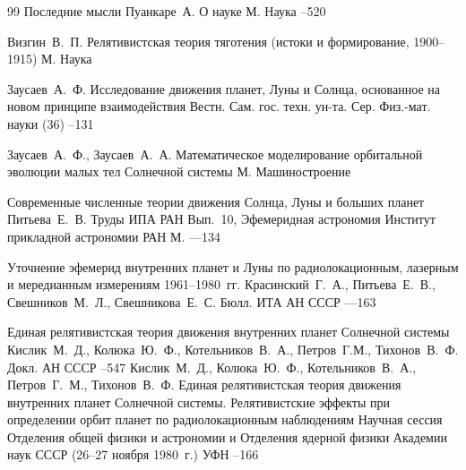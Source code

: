 \begin{thebibliography}{99}
\paper Последние мысли
\by Пуанкаре~А.
\inbook О науке
\publaddr М.
\publ Наука
–520

\by Визгин~В.~П.
\book Релятивистская теория тяготения (истоки и формирование, 1900–1915)
\publaddr М.
\publ Наука

\by Заусаев~А.~Ф.
\paper Исследование движения планет, Луны и Солнца, основанное на новом принципе взаимодействия
\jour Вестн. Сам. гос. техн. ун-та. Сер. Физ.-мат. науки
(36)
--131

\by Заусаев~А.~Ф., Заусаев~А.~А.
\book Математическое моделирование орбитальной эволюции малых тел Солнечной системы
\publaddr М.
\publ Машиностроение



\paper Современные численные теории движения Солнца, Луны и больших планет
\by Питьева~Е.~В.
\inbook Труды ИПА РАН
\volinfo Вып.~10, Эфемеридная астрономия
\publ Институт прикладной астрономии РАН
\publaddr М.
---134

\paper Уточнение эфемерид внутренних планет и Луны по радиолокационным, лазерным и мередианным измерениям 1961--1980~гг.
\by Красинский~Г.~А., Питьева~Е.~В., Свешников~М.~Л., Свешникова~Е.~С.
\jour Бюлл. ИТА АН СССР
---163

\paper Единая релятивистская теория движения внутренних планет Солнечной системы
\by Кислик~М.~Д., Колюка~Ю.~Ф., Котельников~В.~А., Петров~Г.М., Тихонов~В.~Ф.
\jour Докл. АН СССР
--547
\morerref
\by Кислик~М.~Д., Колюка~Ю.~Ф., Котельников~В.~А., Петров~Г.~М., Тихонов~В.~Ф.
\paper Единая релятивистская теория движения внутренних планет Солнечной системы. Релятивистские эффекты при определении орбит планет по радиолокационным наблюдениям
\paperinfo Научная сессия Отделения общей физики и астрономии и Отделения ядерной физики Академии наук СССР (26--27 ноября 1980~г.)
\jour УФН 
–166 


\end{thebibliography}
